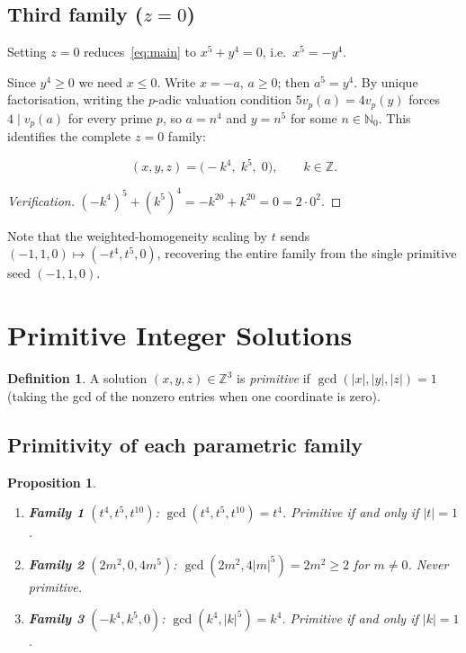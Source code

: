 \documentclass[12pt,a4paper]{article}
\newtheorem{proposition}[theorem]{Proposition}
\theoremstyle{definition}
\newtheorem{definition}[theorem]{Definition}
\newcommand{\Z}{\mathbb{Z}}
\newcommand{\N}{\mathbb{N}}
\begin{document}
\subsection{Third family ($z = 0$)}

Setting $z = 0$ reduces~\eqref{eq:main} to $x^5 + y^4 = 0$, i.e.\ $x^5 = -y^4$.

Since $y^4 \geq 0$ we need $x \leq 0$.  Write $x = -a$, $a \geq 0$; then $a^5 = y^4$.
By unique factorisation, writing the $p$-adic valuation condition $5v_p(a) = 4v_p(y)$
forces $4 \mid v_p(a)$ for every prime $p$, so $a = n^4$ and $y = n^5$ for some $n \in \N_0$.
This identifies the complete $z = 0$ family:

\begin{equation}\label{eq:family3}
  (x, y, z) = \bigl(-k^4,\; k^5,\; 0\bigr), \qquad k \in \Z.
\end{equation}

\begin{proof}[Verification]
  $(-k^4)^5 + (k^5)^4 = -k^{20} + k^{20} = 0 = 2\cdot 0^2.$
\end{proof}

Note that the weighted-homogeneity scaling by $t$ sends $(-1, 1, 0) \mapsto (-t^4, t^5, 0)$,
recovering the entire family from the single primitive seed $(-1, 1, 0)$.

\section{Primitive Integer Solutions}\label{sec:primitive}

\begin{definition}
  A solution $(x, y, z) \in \Z^3$ is \emph{primitive} if
  $\gcd(|x|,|y|,|z|) = 1$ (taking the gcd of the nonzero entries when one
  coordinate is zero).
\end{definition}

\subsection{Primitivity of each parametric family}

\begin{proposition}\label{prop:prim-families}
  \begin{enumerate}[label=\emph{(\roman*)}]
    \item \textbf{Family 1} $(t^4, t^5, t^{10})$:
      $\gcd(t^4, t^5, t^{10}) = t^4$.  Primitive if and only if $|t| = 1$.
    \item \textbf{Family 2} $(2m^2, 0, 4m^5)$:
      $\gcd(2m^2, 4|m|^5) = 2m^2 \geq 2$ for $m \neq 0$.  Never primitive.
    \item \textbf{Family 3} $(-k^4, k^5, 0)$:
      $\gcd(k^4, |k|^5) = k^4$.  Primitive if and only if $|k| = 1$.
  \end{enumerate}
\end{proposition}
\end{document}
